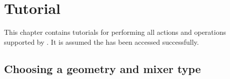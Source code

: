 \chapter{Tutorial}
This chapter contains tutorials for performing all actions and operations supported by \projectname. It is assumed the \applicationname has been accessed successfully. 

%
%
%
%
%
%




\section{Choosing a geometry and mixer type}
\label{sec:ChooseGeomAndMixer}

